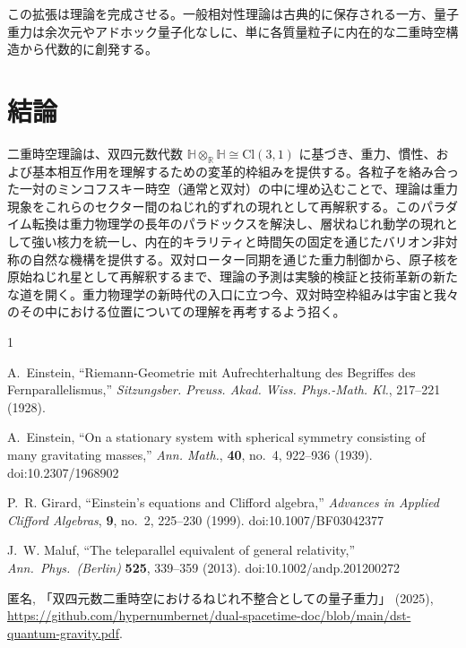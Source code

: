 \documentclass[dvipdfmx,a4paper]{article}
\begin{document}
この拡張は理論を完成させる。一般相対性理論は古典的に保存される一方、量子重力は余次元やアドホック量子化なしに、単に各質量粒子に内在的な二重時空構造から代数的に創発する。

\section{結論}
\label{sec:conclusions}
二重時空理論は、双四元数代数 $\mathbb{H} \otimes_{\mathbb{R}} \mathbb{H} \cong \mathrm{Cl}(3,1)$ に基づき、重力、慣性、および基本相互作用を理解するための変革的枠組みを提供する。各粒子を絡み合った一対のミンコフスキー時空（通常と双対）の中に埋め込むことで、理論は重力現象をこれらのセクター間のねじれ的ずれの現れとして再解釈する。このパラダイム転換は重力物理学の長年のパラドックスを解決し、層状ねじれ動学の現れとして強い核力を統一し、内在的キラリティと時間矢の固定を通じたバリオン非対称の自然な機構を提供する。双対ローター同期を通じた重力制御から、原子核を原始ねじれ星として再解釈するまで、理論の予測は実験的検証と技術革新の新たな道を開く。重力物理学の新時代の入口に立つ今、双対時空枠組みは宇宙と我々のその中における位置についての理解を再考するよう招く。


\begin{thebibliography}{1}
\raggedright

A.~Einstein,
``Riemann-Geometrie mit Aufrechterhaltung des Begriffes des Fernparallelismus,''
\textit{Sitzungsber. Preuss. Akad. Wiss. Phys.-Math. Kl.},
217--221 (1928).

A.~Einstein,
``On a stationary system with spherical symmetry consisting of many gravitating masses,''
\textit{Ann. Math.},
\textbf{40}, no.~4, 922--936 (1939).
doi:10.2307/1968902

P.~R. Girard,
``Einstein’s equations and Clifford algebra,''
\textit{Advances in Applied Clifford Algebras},
\textbf{9}, no.~2, 225--230 (1999).
doi:10.1007/BF03042377

J.~W. Maluf,
``The teleparallel equivalent of general relativity,''
\textit{Ann.\ Phys.\ (Berlin)} \textbf{525}, 339--359 (2013).
doi:10.1002/andp.201200272

 匿名,
「双四元数二重時空におけるねじれ不整合としての量子重力」 (2025),
\url{https://github.com/hypernumbernet/dual-spacetime-doc/blob/main/dst-quantum-gravity.pdf}.

\end{thebibliography}
\end{document}
